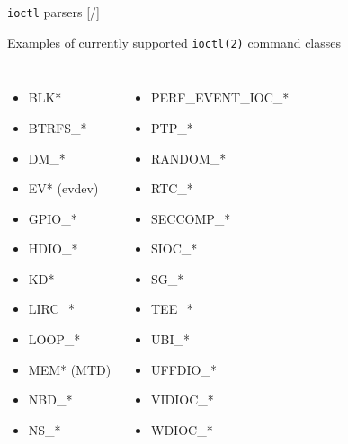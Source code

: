 \documentclass[unicode,aspectratio=169,xcolor={table,dvipsnames,usernames}]{beamer}
\begin{document}
\begin{frame}[fragile]{\texttt{ioctl} parsers \hfill [\insertframenumber/\inserttotalframenumber]}
\begin{block}{\large Examples of currently supported \texttt{ioctl(2)} command classes}
\begin{columns}
	\column{6cm}
		\begin{itemize}
			\item BLK*
			\item BTRFS\_*
			\item DM\_*
			\item EV* (evdev)
			\item GPIO\_*
			\item HDIO\_*
			\item KD*
			\item LIRC\_*
			\item LOOP\_*
			\item MEM* (MTD)
			\item NBD\_*
			\item NS\_*
		\end{itemize}
	\column{6cm}
		\begin{itemize}
			\item PERF\_EVENT\_IOC\_*
			\item PTP\_*
			\item RANDOM\_*
			\item RTC\_*
			\item SECCOMP\_*
			\item SIOC\_*
			\item SG\_*
			\item TEE\_*
			\item UBI\_*
			\item UFFDIO\_*
			\item VIDIOC\_*
			\item WDIOC\_*
		\end{itemize}
\end{columns}
\end{block}
\end{frame}
\end{document}
